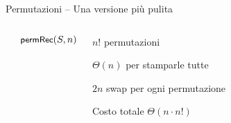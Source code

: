\begin{frame}{Permutazioni -- Una versione più pulita}

\vspace{-9pt}

\vspace{-12pt}
\begin{columns}[T]
\begin{Procedure}
\caption[A]{($\Item[\,]\ S$, \INTEGER\ $i$)}
\end{Procedure}
\begin{Procedure}
\caption[A]{\permutazioni($\Item[\,]\ S$, \INTEGER $n$)}
$\textsf{{\small permRec}}(S,n)$\;
\end{Procedure}

\vspace{-12pt}
\small
\begin{myboxtitle}[Complessità]
\BI
\item $n!$ permutazioni
\item $\Theta(n)$ per stamparle tutte
\item $2n$ swap per ogni permutazione
\item Costo totale $\Theta(n \cdot n!)$
\EI
\end{myboxtitle}

\end{columns}
	
\end{frame}


